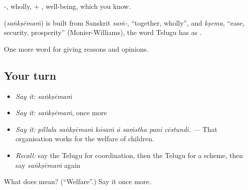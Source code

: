 -, wholly, + , well-being, which you know.

\begin{cousinweb}
\textbf{} (\emph{saṅkṣēmaṁ}) is built from Sanskrit \emph{saṁ-}, \textquotedblleft{}together, wholly\textquotedblright{}, and \emph{kṣema}, \textquotedblleft{}ease, security, prosperity\textquotedblright{} (Monier-Williams), the word Telugu has as .
\end{cousinweb}

\begin{grammarlens}[title={What you've built}]
One more word for giving reasons and opinions.
\end{grammarlens}

\subsection*{Your turn}
\begin{itemize}
\raggedright
  \item \emph{Say it:} \emph{saṅkṣēmaṁ}
  \item \emph{Say it:} \emph{saṅkṣēmaṁ}, once more
  \item \emph{Say it:} \emph{pillala saṅkṣēmaṁ kōsaṁ ā saṁstha pani cēstundi.} — That organisation works for the welfare of children.
  \item \emph{Recall:} say the Telugu for coordination, then the Telugu for a scheme, then say \emph{saṅkṣēmaṁ} again
\end{itemize}

\begin{tcolorbox}[breakable,colback=teal!4,colframe=teal!35!black,title={Before you move on}]
What does  mean? (\textquotedblleft{}Welfare\textquotedblright{}.) Say it once more.
\end{tcolorbox}
